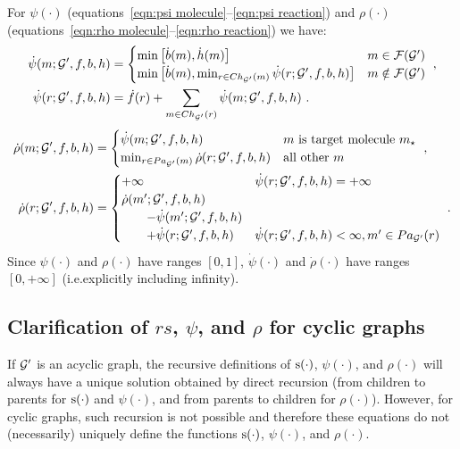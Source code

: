 For $\psi(\cdot)$ (equations~\ref{eqn:psi molecule}--\ref{eqn:psi reaction})
and $\rho(\cdot)$ (equations~\ref{eqn:rho molecule}--\ref{eqn:rho reaction})
we have:
\begin{align}
    \dot\psi(m;{\mathcal{G}}',f,b,h) &= \begin{cases}
        \min\left[
            \dot b(m),
            \dot h(m)
        \right] & m\in\mathcal{F}({\mathcal{G}}') \\
        \min\left[
            \dot b(m),
            \min_{r\in Ch_{{\mathcal{G}}'}(m)}
                \dot\psi(r;{\mathcal{G}}',f,b,h)
        \right] & m\notin\mathcal{F}({\mathcal{G}}') \\
    \end{cases} \ , \\
    \dot\psi(r;{\mathcal{G}}',f,b,h) &= \dot f(r) + \sum_{m\in Ch_{{\mathcal{G}}'}(r)} \dot\psi(m;{\mathcal{G}}',f,b,h)\ . 
\end{align}
\begin{align}
    \dot\rho(m;{\mathcal{G}}',f,b,h) &= \begin{cases}
        \dot\psi(m;{\mathcal{G}}',f,b,h) & m\text{ is target molecule }m_\star \\
        \min_{r\in Pa_{{\mathcal{G}}'}(m)}\dot\rho(r;{\mathcal{G}}',f,b,h) & \text{all other }m \\
    \end{cases}\ , \\
    \dot\rho(r;{\mathcal{G}}',f,b,h) &= \begin{cases}
        +\infty & \dot\psi(r;{\mathcal{G}}',f,b,h) = +\infty \\
        \dot\rho(m';{\mathcal{G}}',f,b,h) \\ \qquad- \dot\psi(m';{\mathcal{G}}',f,b,h) \\ \qquad + \dot\psi(r;{\mathcal{G}}',f,b,h) & \dot\psi(r;{\mathcal{G}}',f,b,h) < \infty, m'\in Pa_{{\mathcal{G}}'}(r)
    \end{cases}\ .
\end{align}
Since $\psi(\cdot)$ and $\rho(\cdot)$ have ranges $[0,1]$,
$\dot\psi(\cdot)$ and $\dot\rho(\cdot)$ have ranges $[0,+\infty]$
(i.e.\@ explicitly including infinity).


\subsection{
    Clarification of
    \texorpdfstring{$rs$, $\psi$, and $\rho$}{s, ψ and ρ}
    for cyclic graphs
}

If ${\mathcal{G}}'$ is an acyclic graph,
the recursive definitions
of ${\textnormal{s}}(\cdot)$, $\psi(\cdot)$, and $\rho(\cdot)$
will always have a unique solution obtained by direct recursion
(from children to parents for ${\textnormal{s}}(\cdot)$ and $\psi(\cdot)$,
and from parents to children for $\rho(\cdot)$).
However, for cyclic graphs, such recursion is not possible
and therefore these equations do not (necessarily) uniquely define
the functions  ${\textnormal{s}}(\cdot)$, $\psi(\cdot)$, and $\rho(\cdot)$.

